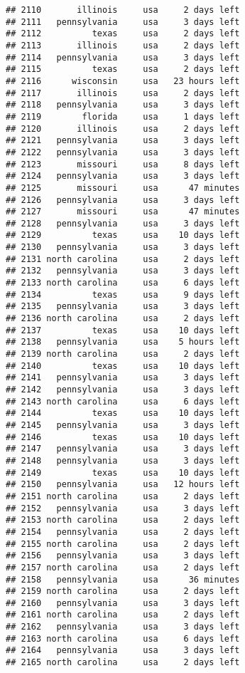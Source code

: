 \documentclass[
]{article}
\begin{document}
\begin{verbatim}
## 2110       illinois     usa     2 days left
## 2111   pennsylvania     usa     3 days left
## 2112          texas     usa     2 days left
## 2113       illinois     usa     2 days left
## 2114   pennsylvania     usa     3 days left
## 2115          texas     usa     2 days left
## 2116      wisconsin     usa   23 hours left
## 2117       illinois     usa     2 days left
## 2118   pennsylvania     usa     3 days left
## 2119        florida     usa     1 days left
## 2120       illinois     usa     2 days left
## 2121   pennsylvania     usa     3 days left
## 2122   pennsylvania     usa     3 days left
## 2123       missouri     usa     8 days left
## 2124   pennsylvania     usa     3 days left
## 2125       missouri     usa      47 minutes
## 2126   pennsylvania     usa     3 days left
## 2127       missouri     usa      47 minutes
## 2128   pennsylvania     usa     3 days left
## 2129          texas     usa    10 days left
## 2130   pennsylvania     usa     3 days left
## 2131 north carolina     usa     2 days left
## 2132   pennsylvania     usa     3 days left
## 2133 north carolina     usa     6 days left
## 2134          texas     usa     9 days left
## 2135   pennsylvania     usa     3 days left
## 2136 north carolina     usa     2 days left
## 2137          texas     usa    10 days left
## 2138   pennsylvania     usa    5 hours left
## 2139 north carolina     usa     2 days left
## 2140          texas     usa    10 days left
## 2141   pennsylvania     usa     3 days left
## 2142   pennsylvania     usa     3 days left
## 2143 north carolina     usa     6 days left
## 2144          texas     usa    10 days left
## 2145   pennsylvania     usa     3 days left
## 2146          texas     usa    10 days left
## 2147   pennsylvania     usa     3 days left
## 2148   pennsylvania     usa     3 days left
## 2149          texas     usa    10 days left
## 2150   pennsylvania     usa   12 hours left
## 2151 north carolina     usa     2 days left
## 2152   pennsylvania     usa     3 days left
## 2153 north carolina     usa     2 days left
## 2154   pennsylvania     usa     2 days left
## 2155 north carolina     usa     2 days left
## 2156   pennsylvania     usa     3 days left
## 2157 north carolina     usa     2 days left
## 2158   pennsylvania     usa      36 minutes
## 2159 north carolina     usa     2 days left
## 2160   pennsylvania     usa     3 days left
## 2161 north carolina     usa     2 days left
## 2162   pennsylvania     usa     3 days left
## 2163 north carolina     usa     6 days left
## 2164   pennsylvania     usa     3 days left
## 2165 north carolina     usa     2 days left

\end{verbatim}
\end{document}
